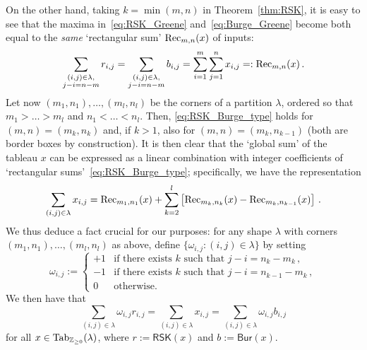 \documentclass[a4paper,reqno,12pt]{amsart}
\theoremstyle{plain}
\theoremstyle{definition}
\newcommand{\Z}{\mathbb{Z}}
\newcommand{\tab}{\textnormal{Tab}}
\newcommand{\1}{\mathbbm{1}}
\newcommand{\RSK}{\mathsf{RSK}}
\newcommand{\Burge}{\mathsf{Bur}}
\begin{document}
On the other hand, taking $k=\min(m,n)$ in Theorem~\ref{thm:RSK}, it is easy to see that the maxima in~\eqref{eq:RSK_Greene} and~\eqref{eq:Burge_Greene} become both equal to the \emph{same} `rectangular sum' ${\rm Rec}_{m,n}(x)$ of inputs:
\begin{equation}
\label{eq:RSK_Burge_type}
\sum_{\substack{(i,j)\in\lambda, \\ j-i = n-m}} r_{i,j}
= \sum_{\substack{(i,j)\in\lambda, \\ j-i = n-m}} b_{i,j}
= \sum_{i=1}^m \sum_{j=1}^n x_{i,j}
=: {\rm Rec}_{m,n}(x) \, .
\end{equation}
Let now $(m_1,n_1),\dots, (m_l,n_l)$ be the corners of a partition $\lambda$, ordered so that $m_1 > \dots > m_l$ and $n_1 < \dots < n_l$.
Then, \eqref{eq:RSK_Burge_type} holds for $(m,n)=(m_k,n_k)$ and, if $k>1$, also for $(m,n)=(m_k,n_{k-1})$ (both are border boxes by construction).
It is then clear that the `global sum' of the tableau $x$ can be expressed as a linear combination with integer coefficients of `rectangular sums'~\eqref{eq:RSK_Burge_type}; specifically, we have the representation
\[
\sum_{(i,j)\in \lambda} x_{i,j}
= {\rm Rec}_{m_1,n_1}(x) + \sum_{k=2}^l \left[{\rm Rec}_{m_k,n_k}(x) - {\rm Rec}_{m_k,n_{k-1}}(x)\right] \, .
\]
We thus deduce a fact crucial for our purposes: for any shape $\lambda$ with corners $(m_1,n_1),\dots, (m_l,n_l)$ as above, define $\{\omega_{i,j}\colon (i,j)\in \lambda\}$ by setting
\[
\omega_{i,j} :=
\begin{cases}
+1 &\text{if there exists $k$ such that } j-i = n_k - m_k \, , \\
-1 &\text{if there exists $k$ such that } j-i = n_{k-1} - m_k \, , \\
0 &\text{otherwise.}
\end{cases}
\]
We then have that
\begin{equation}
\label{eq:sumTableau}
\sum_{(i,j)\in \lambda} \omega_{i,j} r_{i,j}
= \sum_{(i,j)\in \lambda} x_{i,j}
= \sum_{(i,j)\in \lambda} \omega_{i,j} b_{i,j}
\end{equation}
for all $x\in\tab_{\Z_{\geq 0}}(\lambda)$, where $r:= \RSK(x)$ and $b:=\Burge(x)$.
\end{document}
